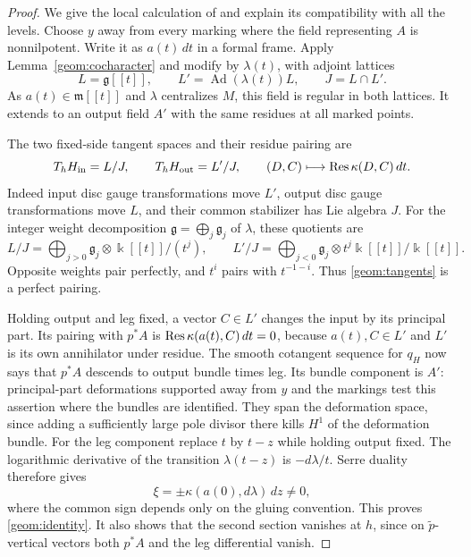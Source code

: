 \begin{proof}
We give the local calculation of \cite[Proposition~3.3]{CT} and explain
its compatibility with all the levels.  Choose $y$ away from every
marking where the field representing $A$ is nonnilpotent.  Write it
as $a(t)\,dt$ in a formal frame.  Apply
Lemma~\ref{geom:cocharacter} and modify by $\lambda(t)$, with adjoint
lattices
\[
 L=\mathfrak g[[t]],\qquad L'=\operatorname{Ad}(\lambda(t))L,
 \qquad J=L\cap L'.
\]
As $a(t)\in\mathfrak m[[t]]$ and $\lambda$ centralizes $M$, this field
is regular in both lattices.  It extends to an output field $A'$ with
the same residues at all marked points.

The two fixed-side tangent spaces and their residue pairing are
\begin{equation}\label{geom:tangents}
 T_hH_{\mathrm{in}}=L/J,\qquad T_hH_{\mathrm{out}}=L'/J,
 \qquad (D,C)\longmapsto\operatorname{Res}\kappa(D,C)\,dt.
\end{equation}
Indeed input disc gauge transformations move $L'$, output disc gauge
transformations move $L$, and their common stabilizer has Lie algebra
$J$.  For the integer weight decomposition
$\mathfrak g=\bigoplus_j\mathfrak g_j$ of $\lambda$, these quotients are
\begin{equation}\label{geom:truncations}
 L/J=\bigoplus_{j>0}\mathfrak g_j\otimes \Bbbk[[t]]/(t^j),\qquad
 L'/J=\bigoplus_{j<0}\mathfrak g_j\otimes t^j\Bbbk[[t]]/\Bbbk[[t]].
\end{equation}
Opposite weights pair perfectly, and $t^i$ pairs with $t^{-1-i}$.
Thus \eqref{geom:tangents} is a perfect pairing.

Holding output and leg fixed, a vector $C\in L'$ changes the input
by its principal part.  Its pairing with $p^*A$ is
$\operatorname{Res}\kappa(a(t),C)\,dt=0$, because $a(t),C\in L'$ and $L'$ is its
own annihilator under residue.  The smooth cotangent sequence for
$q_H$ now says that $p^*A$ descends to output bundle times leg.  Its
bundle component is $A'$: principal-part deformations supported away
from $y$ and the markings test this assertion where the bundles are
identified.  They span the deformation space, since adding a
sufficiently large pole divisor there kills $H^1$ of the deformation
bundle.  For the leg component replace $t$ by $t-z$ while holding
output fixed.  The logarithmic derivative of the transition
$\lambda(t-z)$ is $-d\lambda/t$.  Serre duality therefore gives
\[
                       \xi=\pm\kappa(a(0),d\lambda)\,dz\ne0,
\]
where the common sign depends only on the gluing convention.  This
proves \eqref{geom:identity}.  It also shows that the second section
vanishes at $h$, since on $\widetilde p$-vertical vectors both
$p^*A$ and the leg differential vanish.


\end{proof}
